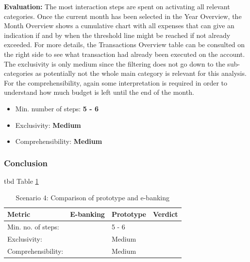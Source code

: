 \textbf{Evaluation:} The most interaction steps are spent on activating all relevant categories. Once the current month has been selected in the Year Overview, the Month Overview shows a cumulative chart with all expenses that can give an indication if and by when the threshold line might be reached if not already exceeded. For more details, the Transactions Overview table can be consulted on the right side to see what transaction had already been executed on the account. The exclusivity is only medium since the filtering does not go down to the sub-categories as potentially not the whole main category is relevant for this analysis. For the comprehensibility, again some interpretation is required in order to understand how much budget is left until the end of the month.
\begin{itemize}[noitemsep,nolistsep]
	\item Min. number of steps: \textbf{5 - 6}
	\item Exclusivity: \textbf{Medium}
	\item Comprehensibility: \textbf{Medium}
\end{itemize}



\subsubsection{Conclusion}

tbd Table \ref{tbl:scenariofourcomparison}

\begin{table}[t]
	\begin{center}
		\begin{tabular}{ | p{3.5cm} | p{3cm} | p{3cm} | p{3cm} | } 
			\hline
			\textbf{Metric} & \textbf{E-banking} & \textbf{Prototype} & \textbf{Verdict} \\
			\hline
			Min. no. of steps: &  & 5 - 6 &  \\
			\hline
			Exclusivity: &  & Medium &  \\
			\hline
			Comprehensibility: &  & Medium &  \\
			\hline
		\end{tabular}
		\caption{Scenario 4: Comparison of prototype and e-banking}
		\label{tbl:scenariofourcomparison}
	\end{center}
\end{table}



